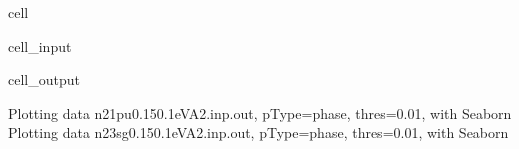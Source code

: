\documentclass[letterpaper,10pt,english]{jupyterBook}
\begin{document}
\begin{sphinxuseclass}{cell}\begin{sphinxVerbatimInput}

\begin{sphinxuseclass}{cell_input}
\begin{sphinxVerbatim}[commandchars=\\\{\}]
\end{sphinxVerbatim}

\end{sphinxuseclass}\end{sphinxVerbatimInput}
\begin{sphinxVerbatimOutput}

\begin{sphinxuseclass}{cell_output}
\begin{sphinxVerbatim}[commandchars=\\\{\}]
Plotting data n2\PYGZus{}1pu\PYGZus{}0.1\PYGZhy{}50.1eV\PYGZus{}A2.inp.out, pType=phase, thres=0.01, with Seaborn
Plotting data n2\PYGZus{}3sg\PYGZus{}0.1\PYGZhy{}50.1eV\PYGZus{}A2.inp.out, pType=phase, thres=0.01, with Seaborn
\end{sphinxVerbatim}

\noindent{}

\noindent{}

\end{sphinxuseclass}\end{sphinxVerbatimOutput}

\end{sphinxuseclass}
\end{document}
